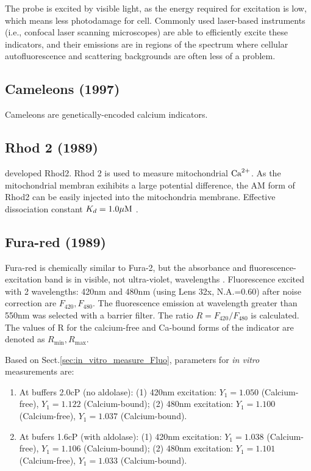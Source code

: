 The probe is excited by visible light, as the energy required for excitation is
low, which means less photodamage for cell. Commonly used laser-based
instruments (i.e., confocal laser scanning microscopes) are able to efficiently
excite these indicators, and their emissions are in regions of the spectrum
where cellular autofluorescence and scattering backgrounds are often less of a
problem.

\subsection{Cameleons (1997)}
\label{sec:cameleons}

Cameleons are genetically-encoded calcium indicators.

\subsection{Rhod 2 (1989)}
\label{sec:rhod_2}

\citep{minta1989} developed Rhod2. Rhod 2 is used to measure mitochondrial
${\text{Ca}^{2+}}$. As the mitochondrial membran exihibits a large potential difference, the
AM form of Rhod2 can be easily injected into the mitochondria membrane.
Effective dissociation constant $K_d=1.0{\mu\text{M}}$ \citep{minta1989}.

\subsection{Fura-red (1989)}

Fura-red is chemically similar to Fura-2, but the absorbance and
fluorescence-excitation band is in visible, not ultra-violet, wavelengths
\citep{demarinis1990}. Fluorescence excited with 2 wavelengths: 420nm and 480nm
(using Lens 32x, N.A.=0.60) after noise correction are $F_{420}, F_{480}$.
The fluorescence emission at wavelength greater than 550nm was selected with a
barrier filter. The ratio $R=F_{420}/F_{480}$ is calculated. The values of R for
the calcium-free and Ca-bound forms of the indicator are denoted as $R_\min,
R_\max$.

Based on Sect.\ref{sec:in_vitro_measure_Fluo}, parameters for {\it in vitro}
measurements are:
\begin{enumerate}
  \item At buffers 2.0cP (no aldolase): (1) 420nm excitation: $Y_1=1.050$
  (Calcium-free), $Y_1=1.122$ (Calcium-bound); (2) 480nm excitation: $Y_1=1.100$
  (Calcium-free), $Y_1=1.037$ (Calcium-bound).
  \item At bufers 1.6cP (with aldolase): (1) 420nm excitation: $Y_1=1.038$
  (Calcium-free), $Y_1=1.106$ (Calcium-bound); (2) 480nm excitation: $Y_1=1.101$
  (Calcium-free), $Y_1=1.033$ (Calcium-bound).
\end{enumerate}

